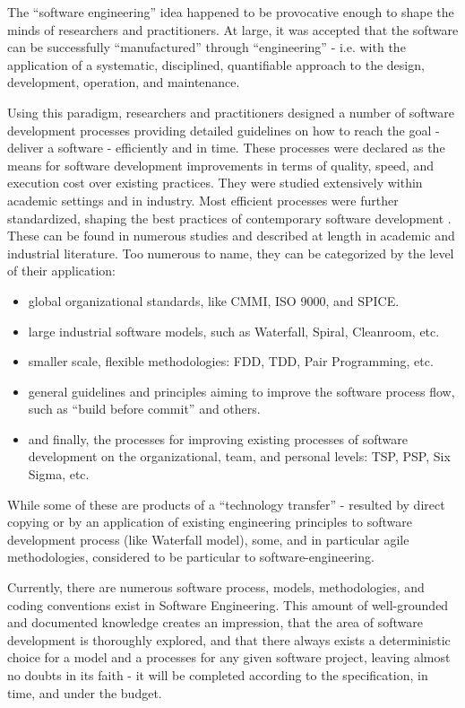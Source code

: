 The ``software engineering'' idea happened to be provocative enough to shape the minds of researchers 
and practitioners. At large, it was accepted that the software can be successfully ``manufactured'' 
through ``engineering'' - i.e. with the application of a systematic, disciplined, quantifiable approach 
to the design, development, operation, and maintenance. 

Using this paradigm, researchers and practitioners designed a number of software development processes 
providing detailed guidelines on how to reach the goal - deliver a software - efficiently and in time. 
These processes were declared as the means for software development improvements in terms of quality, 
speed, and execution cost over existing practices. 
They were studied extensively within academic settings and in industry. Most efficient processes were 
further standardized, shaping the best practices of contemporary software development \cite{citeulike:9962021}. 
These can be found in numerous studies and described at length in academic and industrial literature. 
Too numerous to name, they can be categorized by the level of their application:
\begin{itemize}
 \item global organizational standards, like CMMI, ISO 9000, and SPICE. 
 \item large industrial software models, such as Waterfall, Spiral, Cleanroom, etc.
 \item smaller scale, flexible methodologies: FDD, TDD, Pair Programming, etc.
 \item general guidelines and principles aiming to improve the software process flow, 
such as ``build before commit'' and others.
 \item and finally, the processes for improving existing processes of software development 
on the organizational, team, and personal levels: TSP, PSP, Six Sigma, etc.
\end{itemize}
While some of these are products of a ``technology transfer'' - resulted by direct copying or by an 
application of existing engineering principles to software development process (like Waterfall model), 
some, and in particular agile methodologies, considered to be particular to software-engineering. 

Currently,  there are numerous software process, models, methodologies, and coding conventions exist 
in Software Engineering. This amount of well-grounded and documented knowledge creates an impression,
that the area of software development is thoroughly explored, and that there always exists a deterministic 
choice for a model and a processes for any given software project, leaving almost no doubts in 
its faith - it will be completed according to the specification, in time, and under the budget.

